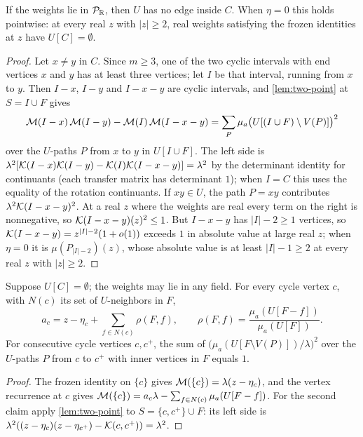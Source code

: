 \begin{lemma}\label{lem:frozen-path}
If the weights lie in $\mathcal{P}_{\mathbb{R}}$, then $U$ has no edge inside $C$. When $\eta=0$ this holds pointwise: at every real $z$ with $|z|\ge2$, real weights satisfying the frozen identities at $z$ have $U[C]=\emptyset$.
\end{lemma}
\begin{proof}
Let $x\neq y$ in $C$. Since $m\ge3$, one of the two cyclic intervals with end vertices $x$ and $y$ has at least three vertices; let $I$ be that interval, running from $x$ to $y$. Then $I-x$, $I-y$ and $I-x-y$ are cyclic intervals, and \cref{lem:two-point} at $S=I\cup F$ gives
\[
\mathcal{M}(I-x)\,\mathcal{M}(I-y)-\mathcal{M}(I)\,\mathcal{M}(I-x-y)=\sum_{P}\mu_a\bigl(U[(I\cup F)\setminus V(P)]\bigr)^{2}
\]
over the $U$-paths $P$ from $x$ to $y$ in $U[I\cup F]$. The left side is $\lambda^{2}[\mathcal{K}(I-x)\mathcal{K}(I-y)-\mathcal{K}(I)\mathcal{K}(I-x-y)]=\lambda^{2}$ by the determinant identity for continuants (each transfer matrix has determinant $1$); when $I=C$ this uses the equality of the rotation continuants. If $xy\in U$, the path $P=xy$ contributes $\lambda^{2}\mathcal{K}(I-x-y)^{2}$. At a real $z$ where the weights are real every term on the right is nonnegative, so $\mathcal{K}(I-x-y)(z)^{2}\le1$. But $I-x-y$ has $|I|-2\ge1$ vertices, so $\mathcal{K}(I-x-y)=z^{|I|-2}(1+o(1))$ exceeds $1$ in absolute value at large real $z$; when $\eta=0$ it is $\mu(P_{|I|-2})(z)$, whose absolute value is at least $|I|-1\ge2$ at every real $z$ with $|z|\ge2$.
\end{proof}

\begin{lemma}\label{lem:env-seen}
Suppose $U[C]=\emptyset$; the weights may lie in any field. For every cycle vertex $c$, with $N(c)$ its set of $U$-neighbors in $F$,
\[
a_c=z-\eta_c+\sum_{f\in N(c)}\rho(F,f),\qquad \rho(F,f)=\frac{\mu_a(U[F-f])}{\mu_a(U[F])}.
\]
For consecutive cycle vertices $c,c^{+}$, the sum of $\bigl(\mu_a(U[F\setminus V(P)])/\lambda\bigr)^{2}$ over the $U$-paths $P$ from $c$ to $c^{+}$ with inner vertices in $F$ equals $1$.
\end{lemma}
\begin{proof}
The frozen identity on $\{c\}$ gives $\mathcal{M}(\{c\})=\lambda(z-\eta_c)$, and the vertex recurrence at $c$ gives $\mathcal{M}(\{c\})=a_c\lambda-\sum_{f\in N(c)}\mu_a(U[F-f])$. For the second claim apply \cref{lem:two-point} to $S=\{c,c^{+}\}\cup F$: its left side is $\lambda^{2}((z-\eta_c)(z-\eta_{c^+})-\mathcal{K}(c,c^{+}))=\lambda^{2}$.
\end{proof}


